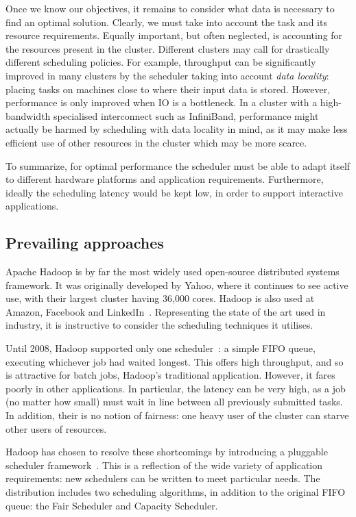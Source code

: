 Once we know our objectives, it remains to consider what data is necessary to find an optimal solution. Clearly, we must take into account the task and its resource requirements. Equally important, but often neglected, is accounting for the resources present in the cluster. Different clusters may call for drastically different scheduling policies. For example, throughput can be significantly improved in many clusters by the scheduler taking into account \emph{data locality}: placing tasks on machines close to where their input data is stored. However, performance is only improved when IO is a bottleneck. In a cluster with a high-bandwidth specialised interconnect such as InfiniBand, performance might actually be harmed by scheduling with data locality in mind, as it may make less efficient use of other resources in the cluster which may be more scarce.

To summarize, for optimal performance the scheduler must be able to adapt itself to different hardware platforms and application requirements. Furthermore, ideally the scheduling latency would be kept low, in order to support interactive applications.

\subsection{Prevailing approaches} \label{sec:prep-scheduling-approaches}

Apache Hadoop is by far the most widely used open-source distributed systems framework. It was originally developed by Yahoo, where it continues to see active use, with their largest cluster having 36,000 cores. Hadoop is also used at Amazon, Facebook and LinkedIn~\cite{HadoopPoweredBy}. Representing the state of the art used in industry, it is instructive to consider the scheduling techniques it utilises. 

Until 2008, Hadoop supported only one scheduler~\cite{HadoopFairSchedulerJIRA}: a simple FIFO queue, executing whichever job had waited longest. This offers high throughput, and so is attractive for batch jobs, Hadoop's traditional application. However, it fares poorly in other applications. In particular, the latency can be very high, as a job (no matter how small) must wait in line between all previously submitted tasks. In addition, their is no notion of fairness: one heavy user of the cluster can starve other users of resources.

Hadoop has chosen to resolve these shortcomings by introducing a pluggable scheduler framework~\cite{HadoopSchedulingIBM}. This is a reflection of the wide variety of application requirements: new schedulers can be written to meet particular needs. The distribution includes two scheduling algorithms, in addition to the original FIFO queue: the Fair Scheduler and Capacity Scheduler. 

